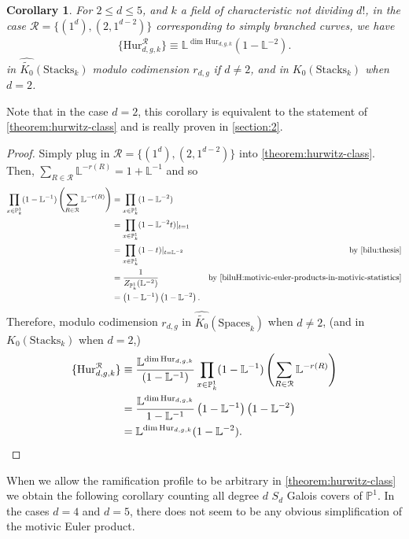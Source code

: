 \documentclass[12 pt]{amsart}
\theoremstyle{plain}
\newtheorem{corollary}[theorem]{Corollary}
\theoremstyle{definition}
\theoremstyle{remark}
\numberwithin{equation}{section}
\newcommand\bl{\mathbb L}
\newcommand\bp{\mathbb P}
\newcommand\hur[3]{\mathrm{Hur}_{#1,#2,#3}} %
\newcommand\rhur[4]{\mathrm{Hur}_{#1,#2,#3}^{#4}} %
\newcommand\codimbound[2]{r_{#1,#2}} %
\newcommand\grcSpaces{\widehat{\widetilde{K_0}}(\mathrm{Spaces}_k)} %
\newcommand\grStacks{K_0(\mathrm{Stacks}_k)} %
\newcommand\grcStacks{\widehat{\widetilde{K_0}}(\mathrm{Stacks}_k)} %
\begin{document}
\begin{corollary} \label{corollary:simply-branched-hurwitz-class} For $2 \leq d
	\leq 5$, and $k$ a field of characteristic not dividing $d!$, in the
	case $\mathcal R = \{(1^d), (2, 1^{d-2})\}$ corresponding to simply
	branched curves, we have \begin{align*} \{\rhur d g k{\mathcal R}\} \equiv
	\bl^{\dim{\hur d g k}}(1-\bl^{-2}).  \end{align*} in $\grcStacks$
	modulo codimension $\codimbound d g$
	if $d \neq 2$, and in $\grStacks$ when $d =2$.
\end{corollary} Note that in the case $d = 2$, this corollary is equivalent to
the statement of \autoref{theorem:hurwitz-class} and is really proven
in \autoref{section:2}.  \begin{proof} Simply plug in $\mathcal R = \{(1^d), (2,
	1^{d-2})\}$ into \autoref{theorem:hurwitz-class}.  Then, $\sum_{R \in
	\mathcal R} \bl^{-r(R)} = 1 + \bl^{-1}$ and so 
	\begin{align*} \prod_{x
		\in \bp^1_k} (1-\bl^{-1})\left( \sum_{R \in \mathcal R}
		\bl^{-r(R)} \right) 
		&= \prod_{x \in \bp^1_k} (1-\bl^{-2})  & \\ 
		&= \prod_{x \in \bp^1_k} (1-\bl^{-2}t)|_{t = 1} \\
		&= \prod_{x \in \bp^1_k} (1-t)|_{t = \bl^{-2}} &
		\text{by \cite[\S3.8, Property 4]{bilu:thesis}}\\
		&= \frac{1}{Z_{\bp^1_k}(\bl^{-2})}  & \text{by \cite[Ex.\
		6.1.12]{biluH:motivic-euler-products-in-motivic-statistics}}
		\\ &= \left( 1- \bl^{-1} \right)\left(
1-\bl^{-2} \right).  \end{align*} 
Therefore, modulo codimension $\codimbound d
g$
in $\grcSpaces$ when $d \neq
2$, (and in $\grStacks$ when $d = 2$,) \begin{align*} \{\rhur d g
	k{\mathcal R}\} &\equiv \frac{\bl^{\dim{\hur d g k}}}{(1-\bl^{-1})}
	\prod_{x \in \bp^1_k} (1-\bl^{-1})\left( \sum_{R \in \mathcal R}
	\bl^{-r(R)} \right) \\ &=  \frac{\bl^{\dim{\hur d g k}}}{1-\bl^{-1}}
	\left( 1- \bl^{-1} \right)\left( 1-\bl^{-2} \right) \\ &= \bl^{\dim{\hur
	d g k}} (1-\bl^{-2}).  \qedhere \end{align*} 
\end{proof}

	When we allow the ramification profile to be arbitrary in
	\autoref{theorem:hurwitz-class} we obtain the following corollary
	counting all degree $d$ $S_d$ Galois covers of $\bp^1$.
	In the cases $d = 4$ and $d = 5$, there does not seem to be any obvious
	simplification of the motivic Euler product.
\end{document}

